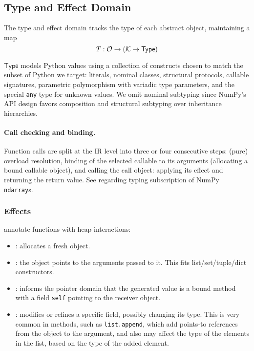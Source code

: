 \subsection{Type and Effect Domain}
\label{sec:type}

The type and effect domain tracks the type of each abstract object, maintaining a map \[T : \mathcal{O} \to (\mathcal{K} \to \mathsf{Type})\] 

$\mathsf{Type}$ models Python values using a collection of constructs chosen to match the subset of Python we target: literals, nominal classes, structural protocols, callable signatures, parametric polymorphism with variadic type parameters, and the special \texttt{any} type for unknown values. We omit nominal subtyping since NumPy's API design favors composition and structural subtyping over inheritance hierarchies.

\paragraph{Call checking and binding.}
Function calls are split at the IR level into three or four consecutive steps: (pure) overload resolution, binding of the selected callable to its arguments (allocating a bound callable object), and calling the call object: applying its effect and returning the return value. See  regarding typing subscription of NumPy \texttt{ndarray}s.

\subsubsection{Effects} annotate functions with heap interactions:
\begin{itemize}
  \item \tnew: allocates a fresh object.
  \item \tptstoargs: the \tnew object points to the arguments passed to it. This fits list/set/tuple/dict constructors.
  \item \tboundmeth: informs the pointer domain that the generated value is a bound method with a field \texttt{self} pointing to the receiver object.
  \item \tupdate: modifies or refines a specific field, possibly changing its type. This is very common in methods, such as \lstinline|list.append|, which add points-to references from the object to the argument,
and also may affect the type of the elements in the list,
based on the type of the added element.
\end{itemize}

